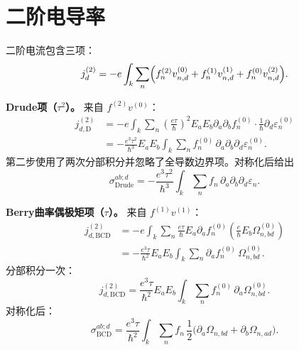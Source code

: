 \section{二阶电导率}

二阶电流包含三项：
\begin{equation}
  j_d^{(2)} = -e\int_k\sum_n \Bigl(
    f_n^{(2)} v_{n,d}^{(0)}
  + f_n^{(1)} v_{n,d}^{(1)}
  + f_n^{(0)} v_{n,d}^{(2)}
  \Bigr).
  \label{j2}
\end{equation}

\textbf{Drude项（\(\tau^2\)）。} 来自 \(f^{(2)}v^{(0)}\)：
\begin{align}
  j_{d,\text{D}}^{(2)}
  &= -e\int_k\sum_n
    \left(\frac{e\tau}{\hbar}\right)^2 E_a E_b \partial_a\partial_b f_n^{(0)}
    \cdot \frac{1}{\hbar}\partial_d\varepsilon_n^{(0)} \nonumber\\
  &= -\frac{e^3\tau^2}{\hbar^3} E_a E_b
    \int_k\sum_n f_n^{(0)} \,
    \partial_a\partial_b\partial_d\varepsilon_n^{(0)} .
  \label{j2_D}
\end{align}
第二步使用了两次分部积分并忽略了全导数边界项。对称化后给出
\begin{equation}
  \sigma_{\text{Drude}}^{ab;d} =
  -\frac{e^3\tau^2}{\hbar^3} \int_k\sum_n f_n \,
  \partial_a\partial_b\partial_d\varepsilon_n .
  \label{s2_D}
\end{equation}

\textbf{Berry曲率偶极矩项（\(\tau\)）。} 来自 \(f^{(1)}v^{(1)}\)：
\begin{align}
  j_{d,\text{BCD}}^{(2)}
  &= -e\int_k\sum_n
    \frac{e\tau}{\hbar} E_a \partial_a f_n^{(0)}
    \left( \frac{e}{\hbar} E_b \Omega_{n,bd}^{(0)} \right) \nonumber\\
  &= -\frac{e^3\tau}{\hbar^2} E_a E_b
    \int_k\sum_n \partial_a f_n^{(0)} \, \Omega_{n,bd}^{(0)} .
\end{align}
分部积分一次：
\begin{equation}
  j_{d,\text{BCD}}^{(2)} = \frac{e^3\tau}{\hbar^2} E_a E_b
    \int_k\sum_n f_n^{(0)} \, \partial_a\Omega_{n,bd}^{(0)} .
    \label{j2_BCD_asym}
\end{equation}
对称化后：
\begin{equation}
  \sigma_{\text{BCD}}^{ab;d} =
  \frac{e^3\tau}{\hbar^2} \int_k\sum_n f_n \,
  \frac12\bigl( \partial_a\Omega_{n,bd} + \partial_b\Omega_{n,ad} \bigr).
  \label{s2_BCD}
\end{equation}

